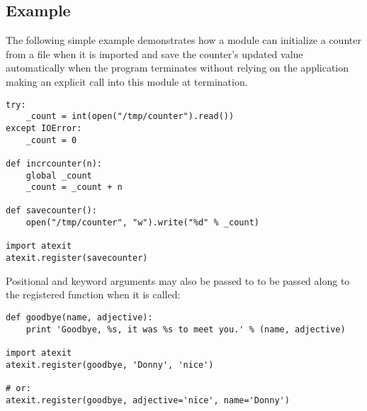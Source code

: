 \begin{seealso}
\end{seealso}


\subsection{ Example \label{atexit-example}}

The following simple example demonstrates how a module can initialize
a counter from a file when it is imported and save the counter's
updated value automatically when the program terminates without
relying on the application making an explicit call into this module at
termination.

\begin{verbatim}
try:
    _count = int(open("/tmp/counter").read())
except IOError:
    _count = 0

def incrcounter(n):
    global _count
    _count = _count + n

def savecounter():
    open("/tmp/counter", "w").write("%d" % _count)

import atexit
atexit.register(savecounter)
\end{verbatim}

Positional and keyword arguments may also be passed to
 to be passed along to the registered function
when it is called:

\begin{verbatim}
def goodbye(name, adjective):
    print 'Goodbye, %s, it was %s to meet you.' % (name, adjective)

import atexit
atexit.register(goodbye, 'Donny', 'nice')

# or:
atexit.register(goodbye, adjective='nice', name='Donny')
\end{verbatim}
